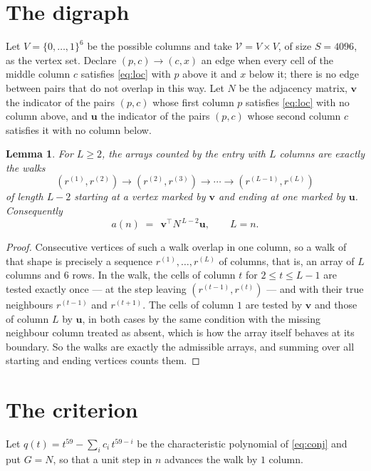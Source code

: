 \documentclass[11pt,a4paper]{article}
\theoremstyle{plain}
\newtheorem{lemma}[theorem]{Lemma}
\theoremstyle{definition}
\begin{document}
\section{The digraph}

Let $V=\{0,\dots,1\}^{6}$ be the possible columns and take
$\mathcal V=V\times V$, of size $S=4096$, as the vertex set. Declare $(p,c)\to(c,x)$ an edge
when every cell of the middle column $c$ satisfies \eqref{eq:loc} with $p$ above it and $x$
below it; there is no edge between pairs that do not overlap in this way. Let $N$ be the
adjacency matrix, $\mathbf{v}$ the indicator of the pairs $(p,c)$ whose first column $p$
satisfies \eqref{eq:loc} with no column above, and $\mathbf{u}$ the indicator of
the pairs $(p,c)$ whose second column $c$ satisfies it with no column below.

\begin{lemma}\label{lem:walk}
For $L\ge2$, the arrays counted by the entry with $L$ columns are exactly the walks
\[
(r^{(1)},r^{(2)})\to(r^{(2)},r^{(3)})\to\cdots\to(r^{(L-1)},r^{(L)})
\]
of length $L-2$ starting at a vertex marked by $\mathbf{v}$ and ending at one marked by
$\mathbf{u}$. Consequently
\[
a(n)\;=\;\,\mathbf{v}^{\!\top}N^{\,L-2}\mathbf{u},\qquad L=n .
\]
\end{lemma}

\begin{proof}
Consecutive vertices of such a walk overlap in one column, so a walk of that shape is
precisely a sequence $r^{(1)},\dots,r^{(L)}$ of columns, that is, an array of $L$ columns
and $6$ rows. In the walk, the cells of column $t$ for $2\le t\le L-1$ are tested
exactly once --- at the step leaving $(r^{(t-1)},r^{(t)})$ --- and with their true
neighbours $r^{(t-1)}$ and $r^{(t+1)}$. The cells of column $1$ are tested by
$\mathbf{v}$ and those of column $L$ by $\mathbf{u}$, in both cases by the same condition
with the missing neighbour column treated as absent, which is how the array itself behaves at
its boundary. So the walks are exactly the admissible arrays, and summing over all starting
and ending vertices counts them.
\end{proof}

\section{The criterion}

Let $q(t)=t^{59}-\sum_i c_i\,t^{59-i}$ be the characteristic polynomial of
\eqref{eq:conj} and put $G=N$, so that a unit step in $n$ advances the walk by
$1$ column.
\end{document}
